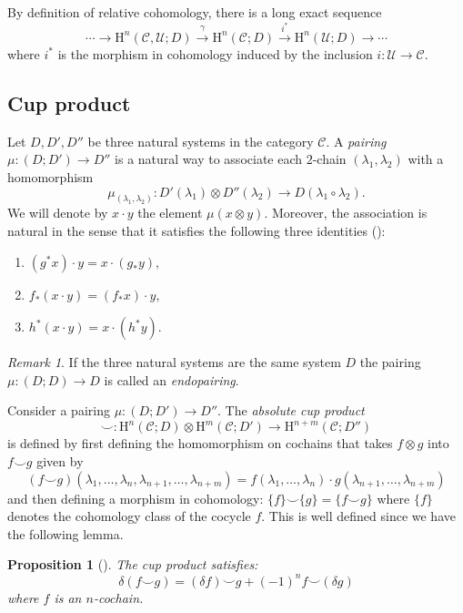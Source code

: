 \documentclass[12pt,reqno]{amsart}
\newtheorem{prop}[teo]{Proposition}
\theoremstyle{definition}
\theoremstyle{remark}
\newtheorem{rem}[teo]{Remark}
\numberwithin{figure}{section}%
\newcommand{\CC}{\mathcal{C}}
\newcommand{\co}{\colon}
\newcommand{\Ho}{\mathrm{H}}
\newcommand{\Uc}{\mathcal{U}}
\begin{document}
By definition of relative cohomology, there is a long exact sequence
\begin{equation}\label{SHORT}
\cdots \to \Ho^n(\CC,\Uc;D) \xrightarrow{\gamma} \Ho^n(\CC;D) \xrightarrow{i^*} \Ho^n(\Uc;D)\to \cdots 
\end{equation}
where $i^*$ is the morphism in cohomology induced by the inclusion $i\colon \Uc \rightarrow \CC$. 

\subsection{Cup product}
   Let $D, D', D''$ be three natural systems in the category $\CC$. A {\em pairing} $\mu \colon(D;D') \rightarrow D''$ is a natural way to associate  each $2$-chain $(\lambda_1,\lambda_2)$ with a homomorphism $$\mu_{(\lambda_1,\lambda_2)}\colon D'(\lambda_1) \otimes D''(\lambda_2) \rightarrow D(\lambda_1 \circ \lambda_2). $$ We will denote by $x \cdot y$ the element $\mu(x \otimes y)$. Moreover, the association is natural in the sense that it satisfies the following three identities (\cite[Def. 5.19]{BAUES0}):
    \begin{enumerate}
        \item $(g^*x) \cdot y=x \cdot (g_*y)$,
        \item $f_*(x\cdot y)=(f_*x)\cdot y$,
        \item $h^* (x \cdot y)= x \cdot (h^*y)$.
    \end{enumerate}

    \begin{rem}
    If the three natural systems are the same system $D$ the pairing $\mu\colon (D;D) \rightarrow D$ is called an {\em endopairing}.
\end{rem}
     
Consider a pairing $\mu\co (D;D') \rightarrow D''$. The \emph{absolute cup product}
    $$\smile \colon \Ho^n(\CC; D) \otimes \Ho^m(\CC;D') \rightarrow \Ho^{n+m}(\CC;D'')$$
  is defined by first defining the homomorphism on cochains that takes $f \otimes g$ into $f \smile g$  given by
    $$(f \smile g) (\lambda_1,\dots,\lambda_n, \lambda_{n+1},\dots,\lambda_{n+m}) = f(\lambda_1,\dots,\lambda_n) \cdot g (\lambda_{n+1},\dots,\lambda_{n+m})$$ and then defining a morphism in cohomology:
    $\{f \} \smile \{g\}= \{f \smile g\}$ where $\{f\}$ denotes the cohomology class of the cocycle $f$. This is well defined since we have the following lemma.
  \begin{prop}[{\cite[Lemma 5.20]{BAUES0}}]\label{Cup-product}
  The cup product satisfies:
    \begin{equation}\label{eq:cup_product}
        \delta(f \smile g)= (\delta f) \smile g + (-1)^n f \smile (\delta g)
    \end{equation}
    where $f$ is an $n$-cochain.
\end{prop}
\end{document}
